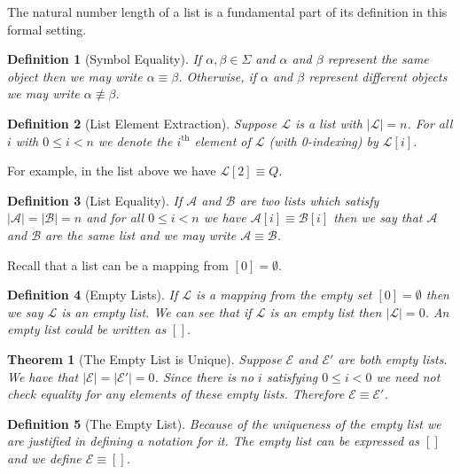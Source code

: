 \documentclass[12pt]{article}
\theoremstyle{break}
\newtheorem{definition}{Definition}[section]
\theoremstyle{break}
\newtheorem{theorem}{Theorem}[section]
\theoremstyle{break}
\theoremstyle{break}
\newcommand{\mc}[1]{\mathcal{#1}}
\begin{document}
The natural number length of a list is a fundamental part of its definition in this formal setting.

\begin{definition}[Symbol Equality]
If $\alpha, \beta \in \Sigma$ and $\alpha$ and $\beta$ represent the same object then we may write $\alpha \equiv \beta$.
Otherwise, if $\alpha$ and $\beta$ represent different objects we may write $\alpha \not \equiv \beta$.
\end{definition}

\begin{definition}[List Element Extraction]
Suppose $\mc{L}$ is a list with $|\mathcal{L}| = n$.
For all $i$ with $0 \le i < n$ we denote the $i^{\text{th}}$ element of $\mc{L}$ (with 0-indexing) by $\mc{L}[i]$.
\end{definition}

For example, in the list above we have $\mc{L}[2] \equiv Q$.

\begin{definition}[List Equality]
If $\mc{A}$ and $\mc{B}$ are two lists which satisfy $|\mc{A}| = |\mc{B}| = n$ and for all $0 \le i < n$ we have $\mc{A}[i] \equiv \mc{B}[i]$ then we say that $\mc{A}$ and $\mc{B}$ are the same list and we may write $\mc{A} \equiv \mc{B}$.
\end{definition}

Recall that a list can be a mapping from $[0] = \emptyset$.

\begin{definition}[Empty Lists]
If $\mc{L}$ is a mapping from the empty set $[0] = \emptyset$ then we say $\mc{L}$ is an empty list.
We can see that if $\mc{L}$ is an empty list then $|\mc{L}| = 0$.
An empty list could be written as $[]$.
\end{definition}

\begin{theorem}[The Empty List is Unique]
Suppose $\mc{E}$ and $\mc{E}'$ are both empty lists.
We have that $|\mc{E}| = |\mc{E}'| = 0 $.
Since there is no $i$ satisfying $0\le i < 0$ we need not check equality for any elements of these empty lists.
Therefore $\mc{E} \equiv \mc{E}'$.
\end{theorem}

\begin{definition}[The Empty List]
Because of the uniqueness of the empty list we are justified in defining a notation for it. The empty list can be expressed as $[]$ and we define $\mc{E} \equiv []$.
\end{definition}
\end{document}

